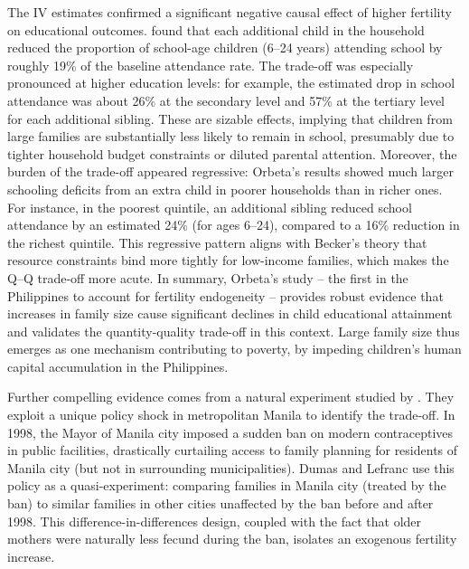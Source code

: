 \documentclass[]{AEA}
\begin{document}
The IV estimates confirmed a significant negative causal effect of
higher fertility on educational outcomes. \citet{orbeta2010number} found
that each additional child in the household reduced the proportion of
school-age children (6--24 years) attending school by roughly 19\% of
the baseline attendance rate. The trade-off was especially pronounced at
higher education levels: for example, the estimated drop in school
attendance was about 26\% at the secondary level and 57\% at the
tertiary level for each additional sibling. These are sizable effects,
implying that children from large families are substantially less likely
to remain in school, presumably due to tighter household budget
constraints or diluted parental attention. Moreover, the burden of the
trade-off appeared regressive: Orbeta's results showed much larger
schooling deficits from an extra child in poorer households than in
richer ones. For instance, in the poorest quintile, an additional
sibling reduced school attendance by an estimated 24\% (for ages 6--24),
compared to a 16\% reduction in the richest quintile. This regressive
pattern aligns with Becker's theory that resource constraints bind more
tightly for low-income families, which makes the Q--Q trade-off more
acute. In summary, Orbeta's study -- the first in the Philippines to
account for fertility endogeneity -- provides robust evidence that
increases in family size cause significant declines in child educational
attainment and validates the quantity-quality trade-off in this context.
Large family size thus emerges as one mechanism contributing to poverty,
by impeding children's human capital accumulation in the Philippines.

Further compelling evidence comes from a natural experiment studied by
\citet{dumas2019sex}. They exploit a unique policy shock in metropolitan
Manila to identify the trade-off. In 1998, the Mayor of Manila city
imposed a sudden ban on modern contraceptives in public facilities,
drastically curtailing access to family planning for residents of Manila
city (but not in surrounding municipalities). Dumas and Lefranc use this
policy as a quasi-experiment: comparing families in Manila city (treated
by the ban) to similar families in other cities unaffected by the ban
before and after 1998. This difference-in-differences design, coupled
with the fact that older mothers were naturally less fecund during the
ban, isolates an exogenous fertility increase.
\end{document}
